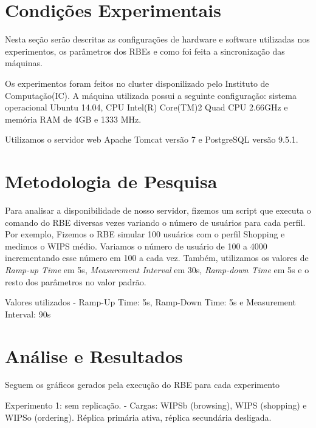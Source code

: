 \documentclass[11pt,twoside]{article}
\begin{document}
\section{Condições Experimentais}
\setlength{\parindent}{4ex}
\begin{itshape}
	 Nesta se\c{c}\~ao ser\~ao descritas as configura\c{c}\~oes de hardware e software utilizadas nos experimentos, os par\^ametros dos RBEs e como foi feita a sincroniza\c{c}\~ao das m\'aquinas.
	
	Os experimentos foram feitos no cluster disponilizado pelo Instituto de Computa\c{c}\~ao(IC). A m\'aquina utilizada possui a seguinte configura\c{c}\~ao: sistema operacional Ubuntu 14.04, CPU Intel(R) Core(TM)2 Quad CPU 2.66GHz e mem\'oria RAM de 4GB e 1333 MHz.

	Utilizamos o servidor web Apache Tomcat vers\~ao 7 e PostgreSQL vers\~ao 9.5.1.

\end{itshape}

\section{Metodologia de Pesquisa}
\setlength{\parindent}{4ex}
\begin{itshape}
Para analisar a disponibilidade de nosso servidor, fizemos um script que executa o comando do RBE diversas vezes variando o n\'umero de usu\'arios para cada perfil. Por exemplo, Fizemos o RBE simular 100 usu\'arios com o perfil Shopping e medimos o WIPS m\'edio. Variamos o n\'umero de usu\'ario de 100 a 4000 incrementando esse n\'umero em 100 a cada vez. Tamb\'em, utilizamos os valores de \textit{Ramp-up Time} em 5s, \textit{Measurement Interval} em 30s, \textit{Ramp-down Time} em 5s e o resto dos par\^ametros no valor padr\~ao.
\end{itshape}

Valores utilizados - Ramp-Up Time: 5s, Ramp-Down Time: 5s e Measurement Interval: 90s

\section{An\'alise e Resultados}
\setlength{\parindent}{4ex}

Seguem os gráficos gerados pela execução do RBE para cada experimento

Experimento 1: sem replicação.
- Cargas: WIPSb (browsing), WIPS (shopping) e WIPSo (ordering).
Réplica primária ativa, réplica secundária desligada.
\end{document}
